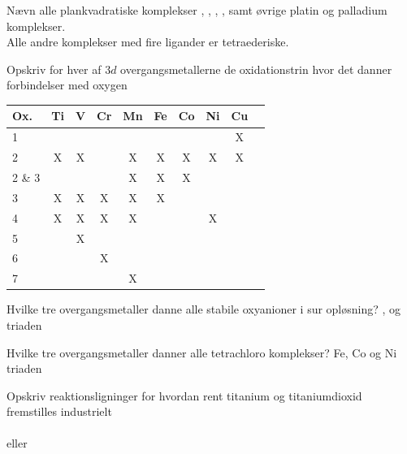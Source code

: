 
\begin{flashcard}[Struktur]{Nævn alle plankvadratiske komplekser}
, , \ce{[Pt(NH3)2Cl2]}, \ce{[Ni(DMG)2]},  samt øvrige platin og palladium komplekser.\\\vspace*{0.5cm}
Alle andre komplekser med fire ligander er tetraederiske.
\end{flashcard}

\begin{flashcard}[Struktur]{Opskriv for hver af $3d$ overgangsmetallerne de oxidationstrin hvor det danner forbindelser med oxygen}
\begin{tabular}{l*{8}{c}r}
Ox.			& Ti & V & Cr & Mn & Fe & Co & Ni & Cu \\
\hline
1			&  &  &  &  &  &  &  & X \\
2			& X & X &  & X & X & X & X & X \\
2 \& 3		&  &  &  & X & X & X &  & \\
3			& X & X & X & X & X &  &  & \\
4			& X & X & X & X &  &  & X & \\
5			&  & X &  &  &  &  &  & \\
6			&  &  & X &  &  &  &  & \\
7			&  &  &  & X &  &  &  & \\
\end{tabular}
\end{flashcard}

\begin{flashcard}[Egenskab]{Hvilke tre overgangsmetaller danne alle stabile oxyanioner i sur opløsning?}
,  og  triaden
\end{flashcard}

\begin{flashcard}[Egenskab]{Hvilke tre overgangsmetaller danner alle tetrachloro komplekser?}
Fe, Co og Ni triaden
\end{flashcard}

\begin{flashcard}[Fremstilling]{Opskriv reaktionsligninger for hvordan rent titanium og titaniumdioxid fremstilles industrielt}
\\\vspace*{0.5cm}
\\
eller\\
\end{flashcard}

